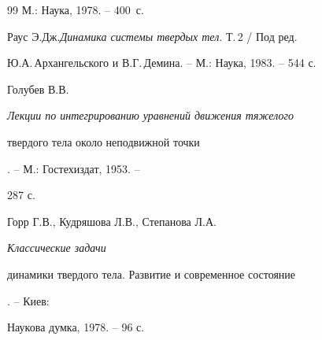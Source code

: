 \begin{thebibliography}{99}
М.: Наука, 1978. -- 400~с.




Раус Э.Дж.{\em Динамика системы твердых тел}. Т.\,2 / Под ред.


Ю.А.\,Архангельского и В.Г.\,Демина. -- М.: Наука, 1983. -- 544 с.




Голубев В.В. {\em Лекции по интегрированию уравнений движения тяжелого


твердого тела около неподвижной точки}. -- М.: Гостехиздат, 1953. --


287 с.




Горр Г.В., Кудряшова Л.В., Степанова Л.А. {\em Классические задачи


динамики твердого тела. Развитие и современное состояние}. -- Киев:


Наукова думка, 1978. -- 96 с.





\end{thebibliography}





\vskip 2cm









\label{end}





